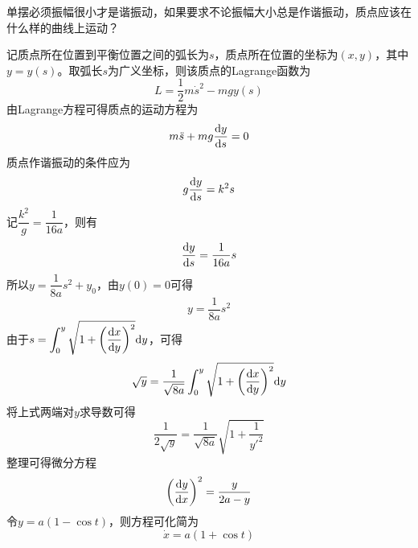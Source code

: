 \begin{question}
单摆必须振幅很小才是谐振动，如果要求不论振幅大小总是作谐振动，质点应该在什么样的曲线上运动？
\end{question}
\begin{solution}
记质点所在位置到平衡位置之间的弧长为$s$，质点所在位置的坐标为$(x,y)$，其中$y=y(s)$。取弧长$s$为广义坐标，则该质点的Lagrange函数为
\begin{equation*}
	L = \frac12 m\dot{s}^2 - mgy(s)
\end{equation*}
由Lagrange方程可得质点的运动方程为
\begin{equation*}
	m\ddot{s} + mg\frac{\mathrm{d} y}{\mathrm{d} s} = 0
\end{equation*}
质点作谐振动的条件应为
\begin{equation*}
	g\frac{\mathrm{d} y}{\mathrm{d} s} = k^2s
\end{equation*}
记$\dfrac{k^2}{g} = \dfrac{1}{16a}$，则有
\begin{equation*}
	\frac{\mathrm{d} y}{\mathrm{d} s} = \frac{1}{16a} s
\end{equation*}
所以$y = \dfrac{1}{8a} s^2+y_0$，由$y(0)=0$可得
\begin{equation*}
	y = \frac{1}{8a} s^2
\end{equation*}
由于$\displaystyle s = \int_0^y \sqrt{1+\left(\frac{\mathrm{d} x}{\mathrm{d} y}\right)^2}\mathrm{d} y$，可得
\begin{equation*}
	\sqrt{y} = \frac{1}{\sqrt{8a}}\int_0^y \sqrt{1+\left(\frac{\mathrm{d} x}{\mathrm{d} y}\right)^2}\mathrm{d} y
\end{equation*}
将上式两端对$y$求导数可得
\begin{equation*}
	\frac{1}{2\sqrt{y}} = \frac{1}{\sqrt{8a}}\sqrt{1+\frac{1}{y'^2}}
\end{equation*}
整理可得微分方程
\begin{equation*}
	\left(\frac{\mathrm{d} y}{\mathrm{d} x}\right)^2 = \frac{y}{2a-y}
\end{equation*}
令$y=a(1-\cos t)$，则方程可化简为
\begin{equation*}
	\dot{x} = a(1+\cos t)
\end{equation*}


\end{solution}
